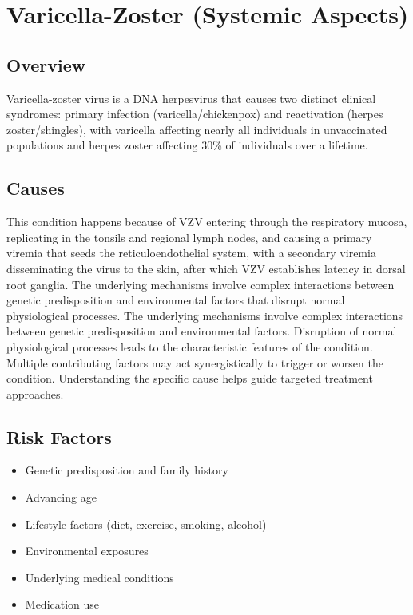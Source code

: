 \chapter{Varicella-Zoster (Systemic Aspects)}
\label{sec:Varicella-Zoster Systemic}

\section{Overview}
Varicella-zoster virus is a DNA herpesvirus that causes two distinct clinical syndromes: primary infection (varicella/chickenpox) and reactivation (herpes zoster/shingles), with varicella affecting nearly all individuals in unvaccinated populations and herpes zoster affecting 30\% of individuals over a lifetime.
\section{Causes}
This condition happens because of VZV entering through the respiratory mucosa, replicating in the tonsils and regional lymph nodes, and causing a primary viremia that seeds the reticuloendothelial system, with a secondary viremia disseminating the virus to the skin, after which VZV establishes latency in dorsal root ganglia. The underlying mechanisms involve complex interactions between genetic predisposition and environmental factors that disrupt normal physiological processes. The underlying mechanisms involve complex interactions between genetic predisposition and environmental factors. Disruption of normal physiological processes leads to the characteristic features of the condition. Multiple contributing factors may act synergistically to trigger or worsen the condition. Understanding the specific cause helps guide targeted treatment approaches.
\section{Risk Factors}


\begin{itemize}[noitemsep]
  \item Genetic predisposition and family history
  \item Advancing age
  \item Lifestyle factors (diet, exercise, smoking, alcohol)
  \item Environmental exposures
  \item Underlying medical conditions
  \item Medication use
\end{itemize}
